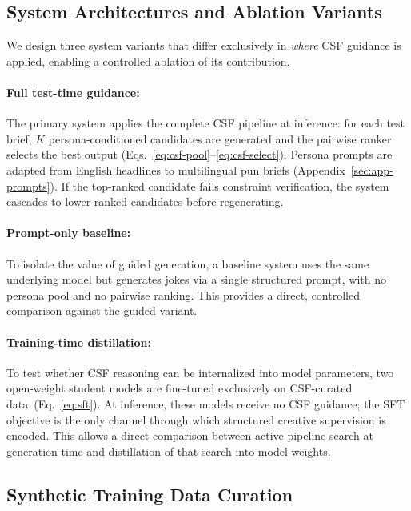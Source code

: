 \documentclass[]{ceurart}
\begin{document}
\subsection{System Architectures and Ablation Variants}
\label{sec:system-designs}

We design three system variants that differ exclusively in \emph{where} CSF
guidance is applied, enabling a controlled ablation of its contribution.

\paragraph{Full test-time guidance:}
The primary system applies the complete CSF pipeline at inference: for each
test brief, $K$ persona-conditioned candidates are generated and the pairwise
ranker selects the best output (Eqs.~\ref{eq:csf-pool}--\ref{eq:csf-select}).
Persona prompts are adapted from English headlines to multilingual pun briefs
(Appendix~\ref{sec:app-prompts}).
If the top-ranked candidate fails constraint verification, the system cascades
to lower-ranked candidates before regenerating.

\paragraph{Prompt-only baseline:}
To isolate the value of guided generation, a baseline system uses the same
underlying model but generates jokes via a single structured prompt, with no
persona pool and no pairwise ranking.
This provides a direct, controlled comparison against the guided variant.

\paragraph{Training-time distillation:}
To test whether CSF reasoning can be internalized into model parameters,
two open-weight student models are fine-tuned exclusively on CSF-curated
data~(Eq.~\ref{eq:sft}).
At inference, these models receive no CSF guidance; the SFT objective is the
only channel through which structured creative supervision is encoded.
This allows a direct comparison between active pipeline search at generation
time and distillation of that search into model weights.

\subsection{Synthetic Training Data Curation}
\label{sec:system-cd}
\end{document}
